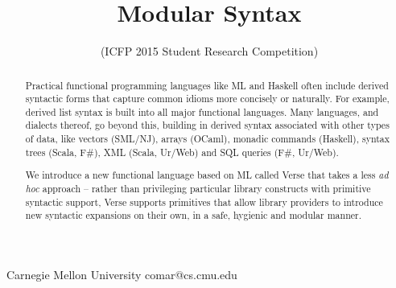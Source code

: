 \documentclass[preprint]{sigplanconf}
\begin{document}
\conferenceinfo{-}{-} 
\copyrightyear{-} 
\copyrightdata{[to be supplied]} 


\title{Modular Syntax}
\subtitle{ (ICFP 2015 Student Research Competition)}

           {Carnegie Mellon University}
           {comar@cs.cmu.edu}   

\maketitle
\begin{abstract}
% 

Practical functional programming languages like ML and Haskell often include derived syntactic forms that capture common idioms more concisely or naturally. For example, derived list syntax is built into all major functional languages. Many languages, and dialects thereof, go beyond this, building in derived syntax associated with other types of data, like vectors (SML/NJ), arrays (OCaml), monadic commands (Haskell), syntax trees (Scala, F\#), XML (Scala, Ur/Web) and SQL queries (F\#, Ur/Web).

We introduce a new functional language based on ML called Verse that takes a less \emph{ad hoc} approach -- rather than privileging particular library constructs with primitive syntactic support, Verse supports primitives that allow library providers to introduce new syntactic expansions on their own, in a safe, hygienic and modular manner.\end{abstract}

\end{document}
